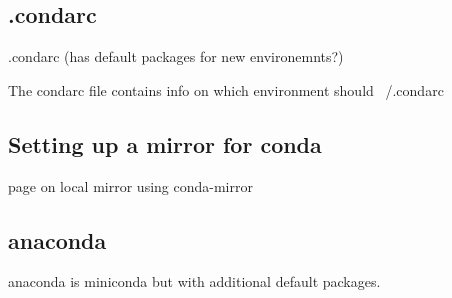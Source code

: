 \subsection{.condarc}
.condarc (has default packages for new environemnts?)

The condarc file contains info on which environment should
~/.condarc

\subsection{Setting up a mirror for conda}


page on local mirror using conda-mirror

\subsection{anaconda}
anaconda is miniconda but with additional default packages.
